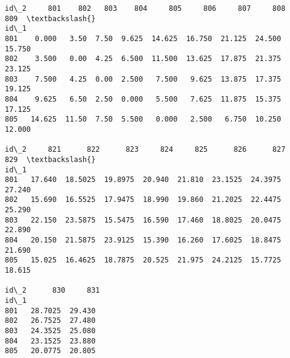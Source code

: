 \documentclass[11pt]{article}
\makeatletter
\newcommand{\boxspacing}{\kern\kvtcb@left@rule\kern\kvtcb@boxsep}
\newcommand{\prompt}[4]{
        {\ttfamily\llap{{\color{#2}[#3]:\hspace{3pt}#4}}\vspace{-\baselineskip}}
    }
\makeatother
\begin{document}
            \begin{tcolorbox}[breakable, size=fbox, boxrule=.5pt, pad at break*=1mm, opacityfill=0]
\prompt{Out}{outcolor}{39}{\boxspacing}
\begin{Verbatim}[commandchars=\\\{\}]
id\_2     801    802   803    804     805     806     807     808     809  \textbackslash{}
id\_1
801    0.000   3.50  7.50  9.625  14.625  16.750  21.125  24.500  15.750
802    3.500   0.00  4.25  6.500  11.500  13.625  17.875  21.375  23.125
803    7.500   4.25  0.00  2.500   7.500   9.625  13.875  17.375  19.125
804    9.625   6.50  2.50  0.000   5.500   7.625  11.875  15.375  17.125
805   14.625  11.50  7.50  5.500   0.000   2.500   6.750  10.250  12.000

id\_2     821      822      823     824     825      826      827     829  \textbackslash{}
id\_1
801   17.640  18.5025  19.8975  20.940  21.810  23.1525  24.3975  27.240
802   15.690  16.5525  17.9475  18.990  19.860  21.2025  22.4475  25.290
803   22.150  23.5875  15.5475  16.590  17.460  18.8025  20.0475  22.890
804   20.150  21.5875  23.9125  15.390  16.260  17.6025  18.8475  21.690
805   15.025  16.4625  18.7875  20.525  21.975  24.2125  15.7725  18.615

id\_2      830     831
id\_1
801   28.7025  29.430
802   26.7525  27.480
803   24.3525  25.080
804   23.1525  23.880
805   20.0775  20.805
\end{Verbatim}
\end{tcolorbox}
        
    \begin{tcolorbox}[breakable, size=fbox, boxrule=1pt, pad at break*=1mm,colback=cellbackground, colframe=cellborder]
\prompt{In}{incolor}{ }{\boxspacing}
\begin{Verbatim}[commandchars=\\\{\}]

\end{Verbatim}
\end{tcolorbox}


    
    
    
\end{document}
